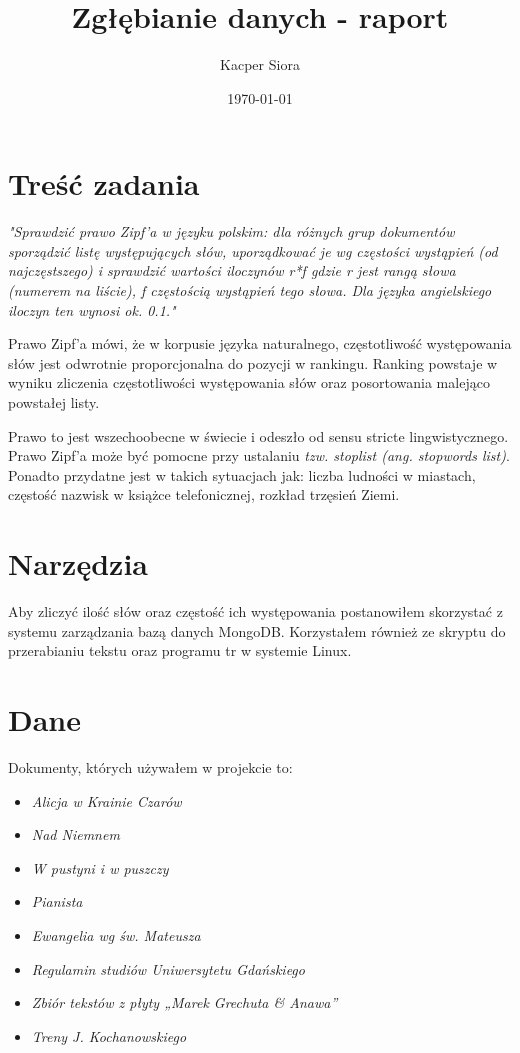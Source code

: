 \documentclass[a4paper]{article}
\title{Zgłębianie danych - raport}
\author{Kacper Siora}
\date{\today}
\begin{document}
\maketitle

\section{Treść zadania}

\hspace{1cm}\textit{"Sprawdzić prawo Zipf’a w języku polskim: dla różnych grup dokumentów sporządzić listę występujących słów, uporządkować je wg częstości wystąpień (od najczęstszego) i sprawdzić wartości iloczynów r*f gdzie r jest rangą słowa (numerem na liście), f częstością wystąpień tego słowa. Dla języka angielskiego iloczyn ten wynosi ok. 0.1."}


\hspace{1cm} Prawo Zipf'a mówi, że w korpusie języka naturalnego, częstotliwość występowania słów jest odwrotnie proporcjonalna do pozycji w rankingu. Ranking powstaje w wyniku zliczenia częstotliwości występowania słów oraz posortowania malejąco powstałej listy. 

\hspace{1cm}Prawo to jest wszechoobecne w świecie i odeszło od sensu stricte lingwistycznego. Prawo Zipf'a może być pomocne przy ustalaniu \textit{tzw. stoplist (ang. stopwords list)}. Ponadto przydatne jest w takich sytuacjach jak: liczba ludności w miastach, częstość nazwisk w książce telefonicznej, rozkład trzęsień Ziemi.


\section{Narzędzia}
\hspace{1cm}Aby zliczyć ilość słów oraz częstość ich występowania postanowiłem skorzystać z systemu zarządzania bazą danych MongoDB. Korzystałem również ze skryptu do przerabianiu tekstu oraz programu tr w systemie Linux. 
\section{Dane}
\hspace{1cm}Dokumenty, których używałem w projekcie to:
\begin{itemize}
\item \textit{Alicja w Krainie Czarów}
\item \textit{Nad Niemnem}
\item \textit{W pustyni i w puszczy}
\item \textit{Pianista}
\item \textit{Ewangelia wg św. Mateusza}
\item \textit{Regulamin studiów Uniwersytetu Gdańskiego}
\item \textit{Zbiór tekstów z płyty  „Marek Grechuta \& Anawa”}
\item \textit{Treny J. Kochanowskiego}
\end{itemize}
\end{document}
